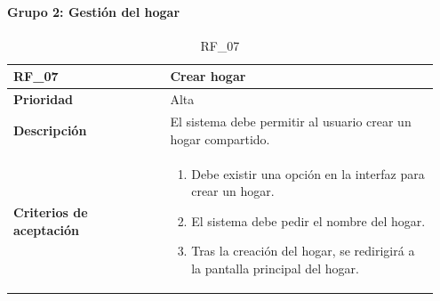 \clearpage

\paragraph{Grupo 2: Gestión del hogar}
\label{subsubsec:grupo2}

\parbox{\textwidth}{ 
   
}

\begin{table}[H]
    \begin{tabular}{|p{0.35\linewidth}|p{0.6\linewidth}|}
        \hline
        \rowcolor[HTML]{C0C0C0}  
        \textbf{RF\_07} & \textbf{Crear hogar} \\
        \hline
        \textbf{Prioridad} & Alta \\
        \hline
        \textbf{Descripción} & El sistema debe permitir al usuario crear un hogar compartido.  \\
        \hline
        \vspace{0.5mm}
        \textbf{Criterios de aceptación} & 
        \begin{minipage}[t]{0.9\linewidth}
            \begin{enumerate}
                \item Debe existir una opción en la interfaz para crear un hogar.
                \item El sistema debe pedir el nombre del hogar.
                \item Tras la creación del hogar, se redirigirá a la pantalla principal del hogar.
            \end{enumerate}
            \vspace{2mm}
        \end{minipage} \\
        \hline
    \end{tabular}
    \caption{RF\_07}
    \label{req:RF07}

\end{table}

